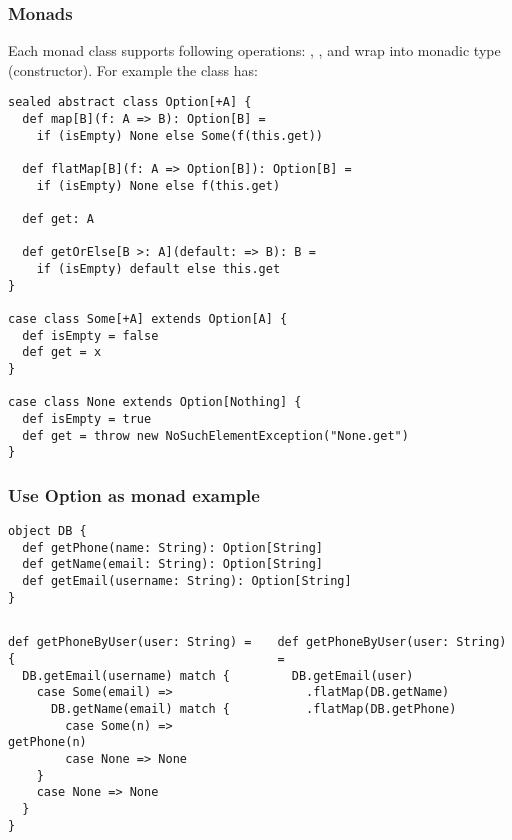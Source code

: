 \documentclass{beamer}
\begin{document}
\begin{frame}[fragile]
\frametitle{Monads}

Each monad class supports following operations: , , and wrap into monadic type (constructor). For example the  class has:

\begin{lstlisting}
sealed abstract class Option[+A] {
  def map[B](f: A => B): Option[B] =
    if (isEmpty) None else Some(f(this.get))

  def flatMap[B](f: A => Option[B]): Option[B] =
    if (isEmpty) None else f(this.get)

  def get: A

  def getOrElse[B >: A](default: => B): B =
    if (isEmpty) default else this.get
}

case class Some[+A] extends Option[A] {
  def isEmpty = false
  def get = x
}

case class None extends Option[Nothing] {
  def isEmpty = true
  def get = throw new NoSuchElementException("None.get")
}
\end{lstlisting}

\end{frame}

\begin{frame}[fragile]
\frametitle{Use Option as monad example}

\begin{lstlisting}
object DB {
  def getPhone(name: String): Option[String]
  def getName(email: String): Option[String]
  def getEmail(username: String): Option[String]
}
\end{lstlisting}

\begin{columns}[t]
\begin{column}{0.5\textwidth}
\begin{lstlisting}
def getPhoneByUser(user: String) = {
  DB.getEmail(username) match {
    case Some(email) => 
      DB.getName(email) match {
        case Some(n) => getPhone(n)
        case None => None
    }
    case None => None
  }
}
\end{lstlisting}
\end{column}
\begin{column}{0.5\textwidth}
\begin{lstlisting}
def getPhoneByUser(user: String) =
  DB.getEmail(user)
    .flatMap(DB.getName)
    .flatMap(DB.getPhone)
\end{lstlisting}
\end{column}
\end{columns}

\end{frame}
\end{document}
